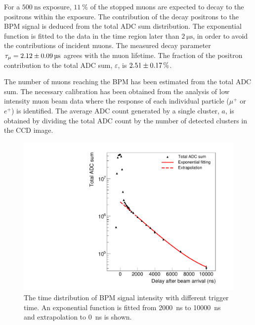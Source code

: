 \documentclass[preprint,3p,twocolumn]{elsarticle}
\begin{document}

For a $\SI{500}{\nano\s}$ exposure, $\SI{11}{\percent}$ of the
stopped muons are expected to decay to the positrons within the
exposure. The contribution of the decay positrons to the BPM
signal is deduced from the total ADC sum distribution. The
exponential function is fitted to the data in the time region
later than $\SI{2}{\micro\s}$, in order to avoid the
contributions of incident muons. The measured decay parameter
$\tau_{\mu}=\SI{2.12 \pm 0.09}{\micro\s}$ agrees with the muon
lifetime. The fraction of the positron contribution to the total
ADC sum, $\varepsilon$, is $\SI{2.51\pm0.17}{\percent}$.

The number of muons reaching the BPM has been estimated from the
total ADC sum. The necessary calibration has been obtained from
the analysis of low intensity muon beam data where the response
of each individual particle ($\mu^+$ or $e^+$) is identified. The
average ADC count generated by a single cluster, $a$, is obtained
by dividing the total ADC count by the number of detected
clusters in the CCD image.

\begin{figure}[btp]
	\centering
	\includegraphics[width=\columnwidth]{figure/Decay_v3.pdf}
	\caption{The time distribution of BPM signal intensity
          with different trigger time. An exponential function is
          fitted from \SI{2000}{\ns} to \SI{10000}{\ns} and
          extrapolation to \SI{0}{\ns} is shown.}
	\label{fig:time_distribution}
\end{figure}
\end{document}
